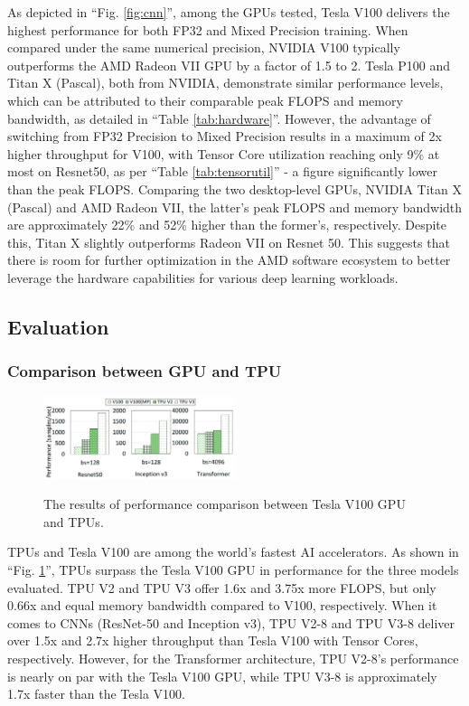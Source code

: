 As depicted in ``Fig. \ref{fig:cnn}'', among the GPUs tested, Tesla V100 delivers the highest performance for both FP32 and Mixed Precision training.
When compared under the same numerical precision, NVIDIA V100 typically outperforms the AMD Radeon VII GPU by a factor of 1.5 to 2.
Tesla P100 and Titan X (Pascal), both from NVIDIA, demonstrate similar performance levels, which can be attributed to their comparable peak FLOPS and memory bandwidth, as detailed in ``Table \ref{tab:hardware}''.
However,
the advantage of switching from FP32 Precision to Mixed Precision results in a maximum of 2x higher throughput for V100,
with Tensor Core utilization reaching only 9\% at most on Resnet50,
as per ``Table \ref{tab:tensorutil}'' - a figure significantly lower than the peak FLOPS.
Comparing the two desktop-level GPUs, NVIDIA Titan X (Pascal) and AMD Radeon VII,
the latter's peak FLOPS and memory bandwidth are approximately 22\% and 52\% higher than the former's, respectively.
Despite this, Titan X slightly outperforms Radeon VII on Resnet 50.
This suggests that there is room for further optimization in the AMD software ecosystem to better leverage the hardware capabilities for various deep learning workloads.

\subsection{Evaluation}
\label{subsec:evaluation}
\subsubsection{Comparison between GPU and TPU}

\begin{figure}[htbp!]
    \centering
    {    \includegraphics[width=0.5\textwidth]{images/tpugpucomp}}
    \caption{The results of performance comparison between Tesla V100 GPU and TPUs.}
    \label{fig:tpugpucomp}
\end{figure}

TPUs and Tesla V100 are among the world's fastest AI accelerators.
As shown in ``Fig. \ref{fig:tpugpucomp}'', TPUs surpass the Tesla V100 GPU in performance for the three models evaluated.
TPU V2 and TPU V3 offer 1.6x and 3.75x more FLOPS, but only 0.66x and equal memory bandwidth compared to V100, respectively.
When it comes to CNNs (ResNet-50 and Inception v3), TPU V2-8 and TPU V3-8 deliver over 1.5x and 2.7x higher throughput than Tesla V100 with Tensor Cores, respectively.
However, for the Transformer architecture, TPU V2-8's performance is nearly on par with the Tesla V100 GPU, while TPU V3-8 is approximately 1.7x faster than the Tesla V100.

